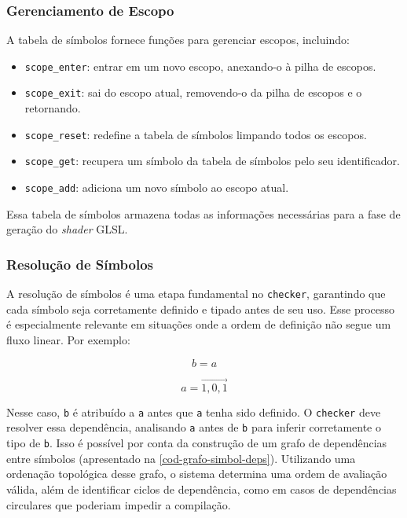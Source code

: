 \subsubsection{Gerenciamento de Escopo}

A tabela de símbolos fornece funções para gerenciar escopos, incluindo:
\begin{itemize}
    \item \texttt{scope\_enter}: entrar em um novo escopo, anexando-o à pilha de escopos.
    \item \texttt{scope\_exit}: sai do escopo atual, removendo-o da pilha de escopos e o retornando.
    \item \texttt{scope\_reset}: redefine a tabela de símbolos limpando todos os escopos.
    \item \texttt{scope\_get}: recupera um símbolo da tabela de símbolos pelo seu identificador.
    \item \texttt{scope\_add}: adiciona um novo símbolo ao escopo atual.
\end{itemize}

Essa tabela de símbolos armazena todas as informações necessárias para a fase de geração do \textit{shader} GLSL.


\subsubsection{Resolução de Símbolos}

A resolução de símbolos é uma etapa fundamental no \texttt{checker}, garantindo que cada símbolo seja corretamente definido e tipado antes de seu uso. Esse processo é especialmente relevante em situações onde a ordem de definição não segue um fluxo linear. Por exemplo:

\[
b = a
\]

\[
a = \vec{1, 0, 1}
\]

Nesse caso, \texttt{b} é atribuído a \texttt{a} antes que \texttt{a} tenha sido definido. O \texttt{checker} deve resolver essa dependência, analisando \texttt{a} antes de \texttt{b} para inferir corretamente o tipo de \texttt{b}. Isso é possível por conta da construção de um grafo de dependências entre símbolos (apresentado na \autoref{cod-grafo-simbol-deps}). Utilizando uma ordenação topológica desse grafo, o sistema determina uma ordem de avaliação válida, além de identificar ciclos de dependência, como em casos de dependências circulares que poderiam impedir a compilação.

